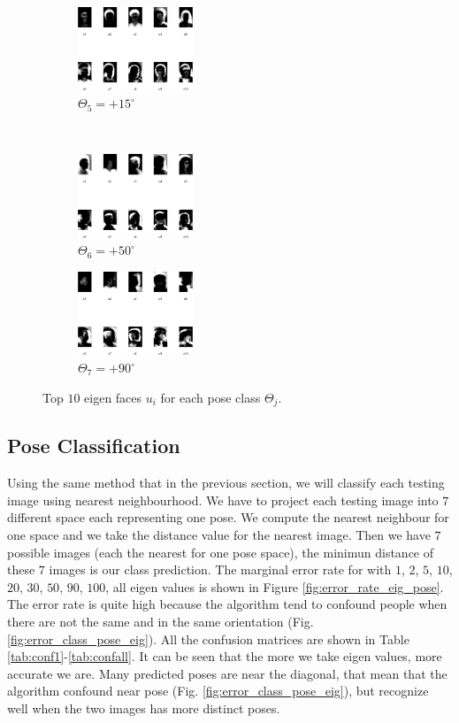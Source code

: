 \documentclass[runningheads,a4paper]{llncs}
\begin{document}
\begin{figure}
\begin{subfigure}[b]{0.4\textwidth}
	\centering
	\includegraphics[height=2.5cm]{Figures/10_eigen_faces_15deg}
\caption{$\Theta_5= +15^{\circ}$}
\end{subfigure}~
\begin{subfigure}[b]{0.4\textwidth}
	\centering
	\includegraphics[height=2.5cm]{Figures/10_eigen_faces_50deg}
\caption{$\Theta_6= +50^{\circ}$}
\end{subfigure}\vspace{5mm}
\begin{subfigure}[b]{0.4\textwidth}
	\centering
	\includegraphics[height=2.5cm]{Figures/10_eigen_faces_90deg}
\caption{$\Theta_7= +90^{\circ}$}
\end{subfigure}
\caption{Top $10$ eigen faces $u_i$ for each pose class $\Theta_j$.}
\label{fig:10_eigen_faces_pose}
\end{figure}

\subsection{Pose Classification}

Using the same method that in the previous section, we will classify each testing image using nearest neighbourhood. We have to project each testing image into $7$ different space each representing one pose. We compute the nearest neighbour for one space and we take the distance value for the nearest image. Then we have $7$ possible images (each the nearest for one pose space), the minimun distance of these $7$ images is our class prediction.
The marginal error rate for with $1$, $2$, $5$, $10$, $20$, $30$, $50$, $90$, $100$, all eigen values is shown in Figure \ref{fig:error_rate_eig_pose}. The error rate is quite high because the algorithm tend to confound people when there are not the same and in the same orientation (Fig. \ref{fig:error_class_pose_eig}). All the confusion matrices are shown in Table \ref{tab:conf1}-\ref{tab:confall}. It can be seen that the more we take eigen values, more accurate we are. Many predicted poses are near the diagonal, that mean that the algorithm confound near pose (Fig. \ref{fig:error_class_pose_eig}), but recognize well when the two images has more distinct poses.
\end{document}
